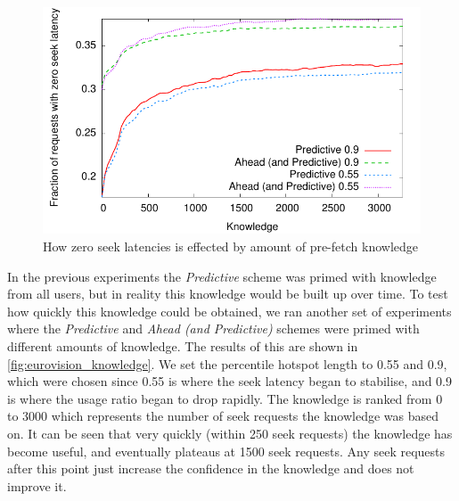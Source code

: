 \begin{figure}[t]
    \centering

    \includegraphics[width=0.5\columnwidth]{./graphs/1206982048-eurovision_tab_average-seek-knowledge}

    \caption{How zero seek latencies is effected by amount of pre-fetch knowledge}
    \label{fig:eurovision_knowledge}

\end{figure}

In the previous experiments the \emph{Predictive} scheme was primed with knowledge from all users, but in reality this knowledge would be built up over time. To test how quickly this knowledge could be obtained, we ran another set of experiments where the \emph{Predictive} and \emph{Ahead (and Predictive)} schemes were primed with different amounts of knowledge. The results of this are shown in \autoref{fig:eurovision_knowledge}. We set the percentile hotspot length to 0.55 and 0.9, which were chosen since 0.55 is where the seek latency began to stabilise, and 0.9 is where the usage ratio began to drop rapidly. The knowledge is ranked from 0 to 3000 which represents the number of seek requests the knowledge was based on. It can be seen that very quickly (within 250 seek requests) the knowledge has become useful, and eventually plateaus at 1500 seek requests. Any seek requests after this point just increase the confidence in the knowledge and does not improve it.

\begin{table}[tb]
 \caption{Example links table, showing the frequency of seeks from one time to another}
\label{tab:links}
\end{table}

